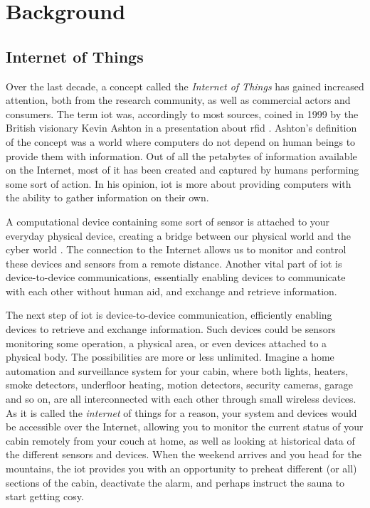 \chapter{Background}
\label{chp:background}

\section{Internet of Things}

Over the last decade, a concept called the \emph{Internet of Things} has gained increased attention, both from the research community, as well as commercial actors and consumers. The term \gls{iot} was, accordingly to most sources, coined in 1999 by the British visionary Kevin Ashton in a presentation about \gls{rfid} \cite{iot-phrase-2} \cite{iot-phrase-1}. Ashton's definition of the concept was a world where computers do not depend on human beings to provide them with information. Out of all the petabytes of information available on the Internet, most of it has been created and captured by humans performing some sort of action. In his opinion, \gls{iot} is more about providing computers with the ability to gather information on their own.




A computational device containing some sort of sensor is attached to your everyday physical device, creating a bridge between our physical world and the cyber world \cite{Kopetz2011}. The connection to the Internet allows us to monitor and control these devices and sensors from a remote distance. Another vital part of \gls{iot} is device-to-device communications, essentially enabling devices to communicate with each other without human aid, and exchange and retrieve information.



The next step of \gls{iot} is device-to-device communication, efficiently enabling devices to retrieve and exchange information. Such devices could be sensors monitoring some operation, a physical area, or even devices attached to a physical body. The possibilities are more or less unlimited. Imagine a home automation and surveillance system for your cabin, where both lights, heaters, smoke detectors, underfloor heating, motion detectors, security cameras, garage and so on, are all interconnected with each other through small wireless devices.  As it is called the \emph{internet} of things for a reason, your system and devices would be accessible over the Internet, allowing you to monitor the current status of your cabin remotely from your couch at home, as well as looking at historical data of the different sensors and devices. When the weekend arrives and you head for the mountains, the \gls{iot} provides you with an opportunity to preheat different (or all) sections of the cabin, deactivate the alarm, and perhaps instruct the sauna to start getting cosy. 

